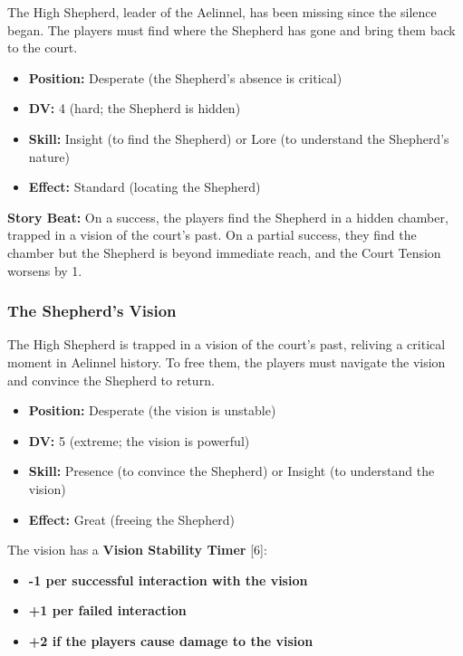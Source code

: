 \documentclass{article}
\begin{document}
The High Shepherd, leader of the Aelinnel, has been missing since the silence began. The players must find where the Shepherd has gone and bring them back to the court.

\begin{itemize}
    \item \textbf{Position:} Desperate (the Shepherd's absence is critical)
    \item \textbf{DV:} 4 (hard; the Shepherd is hidden)
    \item \textbf{Skill:} Insight (to find the Shepherd) or Lore (to understand the Shepherd's nature)
    \item \textbf{Effect:} Standard (locating the Shepherd)
\end{itemize}

\begin{storybox}
\textbf{Story Beat:} On a success, the players find the Shepherd in a hidden chamber, trapped in a vision of the court's past. On a partial success, they find the chamber but the Shepherd is beyond immediate reach, and the Court Tension worsens by 1.
\end{storybox}

\subsubsection{The Shepherd's Vision}

The High Shepherd is trapped in a vision of the court's past, reliving a critical moment in Aelinnel history. To free them, the players must navigate the vision and convince the Shepherd to return.

\begin{itemize}
    \item \textbf{Position:} Desperate (the vision is unstable)
    \item \textbf{DV:} 5 (extreme; the vision is powerful)
    \item \textbf{Skill:} Presence (to convince the Shepherd) or Insight (to understand the vision)
    \item \textbf{Effect:} Great (freeing the Shepherd)
\end{itemize}

The vision has a \textbf{Vision Stability Timer } [6]:

\begin{itemize}
    \item \textbf{-1 per successful interaction with the vision}
    \item \textbf{+1 per failed interaction}
    \item \textbf{+2 if the players cause damage to the vision}
\end{itemize}
\end{document}
